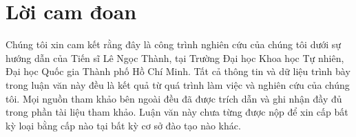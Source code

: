 \chapter*{Lời cam đoan}
\label{reassurances}

Chúng tôi xin cam kết rằng đây là công trình nghiên cứu của chúng tôi dưới sự hướng dẫn của Tiến sĩ Lê Ngọc Thành, tại Trường Đại học Khoa học Tự nhiên, Đại học Quốc gia Thành phố Hồ Chí Minh. Tất cả thông tin và dữ liệu trình bày trong luận văn này đều là kết quả từ quá trình làm việc và nghiên cứu của chúng tôi. Mọi nguồn tham khảo bên ngoài đều đã được trích dẫn và ghi nhận đầy đủ trong phần tài liệu tham khảo. Luận văn này chưa từng được nộp để xin cấp bất kỳ loại bằng cấp nào tại bất kỳ cơ sở đào tạo nào khác.